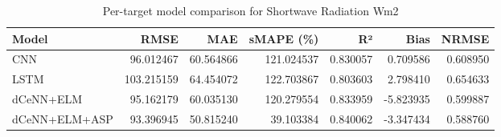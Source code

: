 \begin{table}
\caption{Per-target model comparison for Shortwave Radiation Wm2}
\begin{tabular}{lrrrrrr}
\toprule
Model & RMSE & MAE & sMAPE (\%) & R² & Bias & NRMSE \\
\midrule
CNN & 96.012467 & 60.564866 & 121.024537 & 0.830057 & 0.709586 & 0.608950 \\
LSTM & 103.215159 & 64.454072 & 122.703867 & 0.803603 & 2.798410 & 0.654633 \\
dCeNN+ELM & 95.162179 & 60.035130 & 120.279554 & 0.833959 & -5.823935 & 0.599887 \\
dCeNN+ELM+ASP & 93.396945 & 50.815240 & 39.103384 & 0.840062 & -3.347434 & 0.588760 \\
\bottomrule
\end{tabular}
\end{table}
